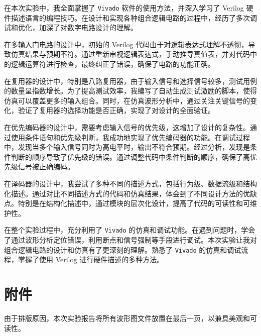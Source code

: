 \documentclass[10pt,a4paper,twoside]{rho-class/rho}
\begin{document}
    在本次实验中，我全面掌握了 \verb|Vivado| 软件的使用方法，并深入学习了 Verilog 硬件描述语言的编程技巧。在设计和实现各种组合逻辑电路的过程中，经历了多次调试和优化，加深了对数字电路设计的理解。
    
    在多输入门电路的设计中，初始的 Verilog 代码由于对逻辑表达式理解不透彻，导致仿真结果与预期不符。通过重新审视逻辑表达式，手动推导真值表，并对代码中的逻辑运算符进行检查，最终纠正了错误，确保了电路的功能正确。
    
    在复用器的设计中，特别是八路复用器，由于输入信号和选择信号较多，测试用例的数量呈指数增长。为了提高测试效率，我编写了自动生成测试激励的脚本，使得仿真可以覆盖更多的输入组合。同时，在仿真波形分析中，通过关注关键信号的变化，验证了复用器的选择功能是否正确，实现了对设计的全面验证。
    
    在优先编码器的设计中，需要考虑输入信号的优先级，这增加了设计的复杂性。通过使用条件语句和优先级判断，我成功地实现了优先编码器的功能。在调试过程中，发现当多个输入信号同时为高电平时，输出不符合预期。经过分析，发现是条件判断的顺序导致了优先级的错误。通过调整代码中条件判断的顺序，确保了高优先级信号被正确编码。
    
    在译码器的设计中，我尝试了多种不同的描述方式，包括行为级、数据流级和结构化描述。通过对比不同描述方式的代码和仿真结果，体会到了不同设计方法的优缺点。特别是在结构化描述中，通过模块的层次化设计，提高了代码的可读性和可维护性。
    
    在整个实验过程中，充分利用了 \verb|Vivado| 的仿真和调试功能。在遇到问题时，学会了通过波形分析定位错误，利用断点和信号强制等手段进行调试。本次实验让我对组合逻辑电路的设计和仿真有了更深刻的理解。熟悉了 \verb|Vivado| 的仿真和调试流程，掌握了使用 Verilog 进行硬件描述的多种方法。
    

 \section{附件}

    由于排版原因，本次实验报告将所有波形图文件放置在最后一页，以兼具美观和可读性。

\clearpage 
\end{document}
